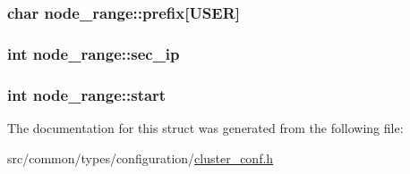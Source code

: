 \subsubsection[{\texorpdfstring{prefix}{prefix}}]{\setlength{\rightskip}{0pt plus 5cm}char node\+\_\+range\+::prefix\mbox{[}{\bf U\+S\+ER}\mbox{]}}\hypertarget{structnode__range_a7a19ed1d62809e24427fc2364d8570dc}{}\label{structnode__range_a7a19ed1d62809e24427fc2364d8570dc}
\subsubsection[{\texorpdfstring{sec\+\_\+ip}{sec_ip}}]{\setlength{\rightskip}{0pt plus 5cm}int node\+\_\+range\+::sec\+\_\+ip}\hypertarget{structnode__range_a13fcb1bbb58d583415ace0fc11febf2f}{}\label{structnode__range_a13fcb1bbb58d583415ace0fc11febf2f}
\subsubsection[{\texorpdfstring{start}{start}}]{\setlength{\rightskip}{0pt plus 5cm}int node\+\_\+range\+::start}\hypertarget{structnode__range_a8eceeed71190e61f7700a2013a0048c6}{}\label{structnode__range_a8eceeed71190e61f7700a2013a0048c6}


The documentation for this struct was generated from the following file\+:\begin{DoxyCompactItemize}
\item 
src/common/types/configuration/\hyperlink{cluster__conf_8h}{cluster\+\_\+conf.\+h}\end{DoxyCompactItemize}
